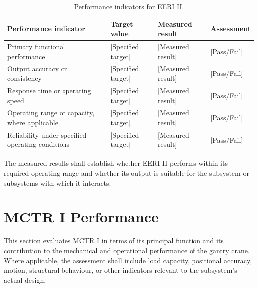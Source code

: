 \begin{table}[H]
    \centering
    \caption{Performance indicators for EERI II.}
    \label{tab:eeri-ii-performance}
    \renewcommand{\arraystretch}{1.4}
    \begin{tabularx}{\textwidth}{|X|X|X|X|}
        \hline
        \textbf{Performance indicator} &
        \textbf{Target value} &
        \textbf{Measured result} &
        \textbf{Assessment} \\
        \hline
        Primary functional performance &
        [Specified target] &
        [Measured result] &
        [Pass/Fail] \\
        \hline
        Output accuracy or consistency &
        [Specified target] &
        [Measured result] &
        [Pass/Fail] \\
        \hline
        Response time or operating speed &
        [Specified target] &
        [Measured result] &
        [Pass/Fail] \\
        \hline
        Operating range or capacity, where applicable &
        [Specified target] &
        [Measured result] &
        [Pass/Fail] \\
        \hline
        Reliability under specified operating conditions &
        [Specified target] &
        [Measured result] &
        [Pass/Fail] \\
        \hline
    \end{tabularx}
\end{table}

The measured results shall establish whether EERI II performs
within its required operating range and whether its output is
suitable for the subsystem or subsystems with which it interacts.

\section{MCTR I Performance}
\label{sec:mctr-i-performance}

This section evaluates MCTR I in terms of its principal function
and its contribution to the mechanical and operational performance
of the gantry crane. Where applicable, the assessment shall include
load capacity, positional accuracy, motion, structural behaviour,
or other indicators relevant to the subsystem's actual design.

